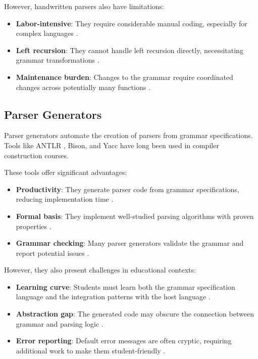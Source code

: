 However, handwritten parsers also have limitations:
\begin{itemize}
    \item \textbf{Labor-intensive}: They require considerable manual coding, especially for complex languages \cite{grune2012modern}.
    \item \textbf{Left recursion}: They cannot handle left recursion directly, necessitating grammar transformations \cite{aho2007compilers}.
    \item \textbf{Maintenance burden}: Changes to the grammar require coordinated changes across potentially many functions \cite{crenshaw1988lets}.
\end{itemize}

\subsection{Parser Generators}

Parser generators automate the creation of parsers from grammar specifications. Tools like ANTLR \cite{parr2013definitive}, Bison, and Yacc have long been used in compiler construction courses.

These tools offer significant advantages:
\begin{itemize}
    \item \textbf{Productivity}: They generate parser code from grammar specifications, reducing implementation time \cite{levine2009flex}.
    \item \textbf{Formal basis}: They implement well-studied parsing algorithms with proven properties \cite{aho2007compilers}.
    \item \textbf{Grammar checking}: Many parser generators validate the grammar and report potential issues \cite{parr2013definitive}.
\end{itemize}

However, they also present challenges in educational contexts:
\begin{itemize}
    \item \textbf{Learning curve}: Students must learn both the grammar specification language and the integration patterns with the host language \cite{sestoft2017programming}.
    \item \textbf{Abstraction gap}: The generated code may obscure the connection between grammar and parsing logic \cite{grune2012modern}.
    \item \textbf{Error reporting}: Default error messages are often cryptic, requiring additional work to make them student-friendly \cite{tratt2010parsing}.
\end{itemize}


